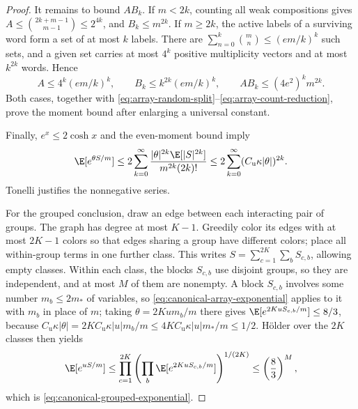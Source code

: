 \begin{proof}
It remains to bound $A B_k$.  If $m<2k$, counting all weak compositions gives
$A\le\binom{2k+m-1}{m-1}\le2^{4k}$, and $B_k\le m^{2k}$.
If $m\ge2k$, the active labels of a surviving word form a set of at most $k$ labels.  There are $\sum_{n=0}^k\binom mn\le(em/k)^k$ such sets, and a given set carries at most $4^k$ positive multiplicity vectors and at most $k^{2k}$ words.  Hence
\begin{equation}
 A\le4^k(em/k)^k,\qquad
 B_k\le k^{2k}(em/k)^k,\qquad
 A B_k\le(4e^2)^k m^{2k}.
 \label{eq:array-combinatorial-bound}
\end{equation}
Both cases, together with \eqref{eq:array-random-split}--\eqref{eq:array-count-reduction}, prove the moment bound after enlarging a universal constant.

Finally, $e^x\le2\cosh x$ and the even-moment bound imply
\begin{equation}
 \E[e^{\theta S/m}]
 \le2\sum_{k=0}^\infty
 \frac{|\theta|^{2k}\E[|S|^{2k}]}{m^{2k}(2k)!}
 \le2\sum_{k=0}^\infty(C_{\mathrm u}\kappa|\theta|)^{2k}.
 \label{eq:array-exponential-series}
\end{equation}
Tonelli justifies the nonnegative series.

For the grouped conclusion, draw an edge between each interacting pair of groups.  The graph has degree at most $K-1$.  Greedily color its edges with at most $2K-1$ colors so that edges sharing a group have different colors; place all within-group terms in one further class.  This writes $S=\sum_{c=1}^{2K}\sum_b S_{c,b}$, allowing empty classes.  Within each class, the blocks $S_{c,b}$ use disjoint groups, so they are independent, and at most $M$ of them are nonempty.  A block $S_{c,b}$ involves some number $m_b\le2m_*$ of variables, so \eqref{eq:canonical-array-exponential} applies to it with $m_b$ in place of $m$; taking $\theta=2Kum_b/m$ there gives $\E[e^{2KuS_{c,b}/m}]\le8/3$, because $C_{\mathrm u}\kappa|\theta|=2KC_{\mathrm u}\kappa|u|m_b/m\le4KC_{\mathrm u}\kappa|u|m_*/m\le1/2$.  H\"older over the $2K$ classes then yields
\begin{equation}
 \E[e^{uS/m}]
 \le\prod_{c=1}^{2K}
      \left(\prod_b\E[e^{2KuS_{c,b}/m}]\right)^{1/(2K)}
 \le\left(\frac83\right)^M,
 \label{eq:array-grouped-holder}
\end{equation}
which is \eqref{eq:canonical-grouped-exponential}.
\end{proof}
